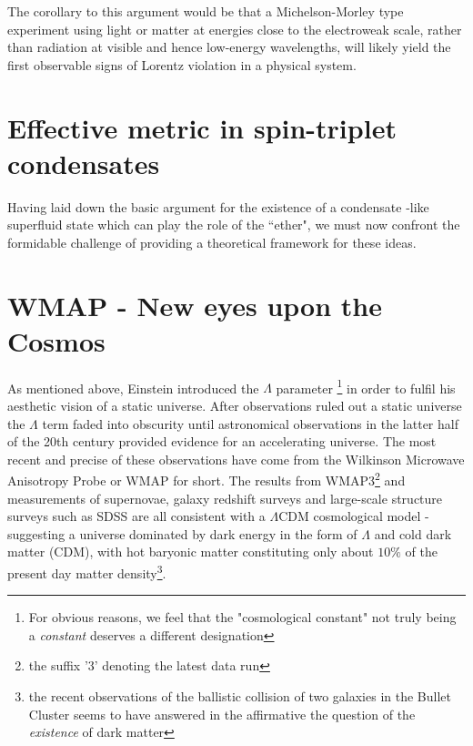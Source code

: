 \begin{doublespace}
The corollary to this argument would be that a Michelson-Morley type experiment using light or matter at energies close to the electroweak scale, rather than radiation at visible and hence low-energy wavelengths, will likely yield the first observable signs of Lorentz violation in a physical system.

\section{Effective metric in spin-triplet condensates}

Having laid down the basic argument for the existence of a condensate -like superfluid state which can play the role of the ``ether", we must now confront the formidable challenge of providing a theoretical framework for these ideas.

\section{WMAP - New eyes upon the Cosmos}

As mentioned above, Einstein introduced the $\Lambda$ parameter \footnote{For obvious reasons, we feel that the "cosmological constant" not truly being a \emph{constant} deserves a different designation} in order to fulfil his aesthetic vision of a static universe. After observations ruled out a static universe the $\Lambda$ term faded into obscurity until astronomical observations in the latter half of the 20th century provided evidence for an accelerating universe. The most recent and precise of these observations have come from the Wilkinson Microwave Anisotropy Probe or WMAP for short. The results from WMAP3\footnote{the suffix '3' denoting the latest data run} and measurements of supernovae, galaxy redshift surveys and large-scale structure surveys such as SDSS are all consistent with a $\Lambda$CDM cosmological model - suggesting a universe dominated by dark energy in the form of $\Lambda$ and cold dark matter (CDM), with hot baryonic matter constituting only about $10\%$ of the present day matter density\footnote{the recent observations of the ballistic collision of two galaxies in the Bullet Cluster seems to have answered in the affirmative the question of the \emph{existence} of dark matter}.


\end{doublespace}
